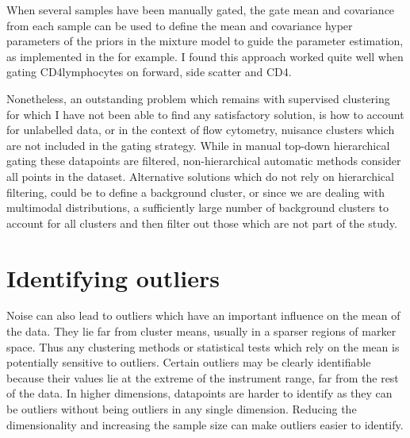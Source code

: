 When several samples have been manually gated, the gate mean and covariance from each sample can be used to define the mean and covariance hyper parameters of the priors in the mixture model to guide the parameter estimation, as implemented in the  for example.
I found this approach worked quite well when gating CD4\positive lymphocytes on forward, side scatter and CD4.

Nonetheless, an outstanding problem which remains with supervised clustering for which I have not been able to find any satisfactory solution, is how to account for unlabelled data, or in the context of flow cytometry, nuisance clusters which are not included in the gating strategy.
While in manual top-down hierarchical gating these datapoints are filtered, non-hierarchical automatic methods consider all points in the dataset.
Alternative solutions which do not rely on hierarchical filtering, could be to define a background cluster, or since we are dealing with multimodal distributions, a sufficiently large number of background clusters to account for all clusters and then filter out those which are not part of the study.



\section{ Identifying outliers }

Noise can also lead to outliers which have an important influence on the mean of the data.
They lie far from cluster means, usually in a sparser regions of marker space.
Thus any clustering methods or statistical tests which rely on the mean is potentially sensitive to outliers.
Certain outliers may be clearly identifiable because their values lie at the extreme of the instrument range, far from the rest of the data.
In higher dimensions, datapoints are harder to identify as they can be outliers without being outliers in any single dimension.
Reducing the dimensionality and increasing the sample size can make outliers easier to identify.

